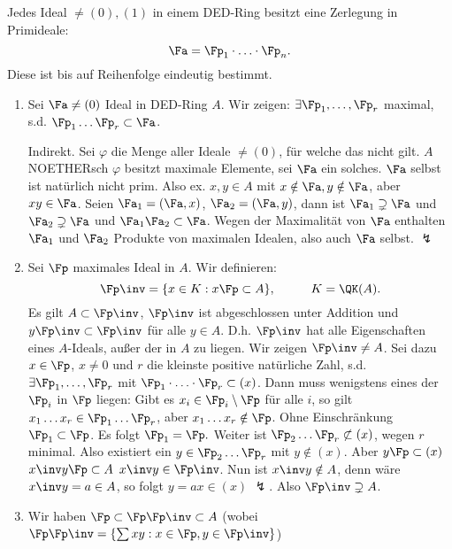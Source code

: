 \begin{Satz}
 Jedes Ideal $\neq (0),(1)$ in einem DED-Ring
 besitzt eine Zerlegung in Primideale: \[\Fa=\Fp_1\cdot\ldots\cdot \Fp_n. \]
 Diese ist bis auf Reihenfolge eindeutig bestimmt.
\end{Satz}

\begin{Beweis}
 \begin{enumerate}
  \item Sei $\Fa\neq (0)$ Ideal in DED-Ring $A$. Wir zeigen: $\exists \Fp_1,\ldots,\Fp_r$ maximal, s.d. $\Fp_1\ldots\Fp_r\subset\Fa$.
  
  Indirekt. Sei $\varphi$ die Menge aller Ideale $\neq (0)$, für welche das nicht gilt. $A$ NOETHERsch \folge $\varphi$ besitzt maximale Elemente, sei $\Fa$ ein solches. $\Fa$ selbst ist natürlich nicht prim. Also ex. $x,y\in A$ mit $x\notin \Fa, y\notin\Fa$, aber $xy\in\Fa$. Seien $\Fa_1=(\Fa,x)$, $\Fa_2=(\Fa,y)$, dann ist $\Fa_1\supsetneq \Fa$ und $\Fa_2\supsetneq \Fa$ und $\Fa_1\Fa_2\subset\Fa$. Wegen der Maximalität von $\Fa$ enthalten $\Fa_1$ und $\Fa_2$ Produkte von maximalen Idealen, also auch $\Fa$ selbst. $\lightning$
  \item Sei $\Fp$ maximales Ideal in $A$. Wir definieren:
  \[ \Fp\inv = \{ x\in K : x\Fp\subset A\},\hspace{1cm} K=\QK(A).\]
  Es gilt $A\subset \Fp\inv$, $\Fp\inv$ ist abgeschlossen unter Addition und $y\Fp\inv\subset\Fp\inv$ für alle $y\in A$. D.h. $\Fp\inv$ hat alle Eigenschaften eines $A$-Ideals, außer der in $A$ zu liegen. Wir zeigen $\Fp\inv\neq A$.
  Sei dazu $x\in\Fp$, $x\neq 0$ und $r$ die kleinste positive natürliche Zahl, s.d. $\exists \Fp_1,\ldots,\Fp_r$ mit $\Fp_1\cdot\ldots\cdot \Fp_r\subset (x)$.
  Dann muss wenigstens eines der $\Fp_i$ in $\Fp$ liegen: Gibt es $x_i\in\Fp_i\setminus\Fp$ für alle $i$, so gilt $x_1\ldots x_r\in\Fp_1\ldots\Fp_r$, aber $x_1\ldots x_r\notin \Fp$. Ohne Einschränkung $\Fp_1\subset \Fp$. Es folgt $\Fp_1=\Fp.$ Weiter ist $\Fp_2\ldots\Fp_r\not\subset (x)$, wegen $r$ minimal. Also existiert ein $y\in\Fp_2\ldots\Fp_r$ mit $y\notin (x)$. Aber $y\Fp\subset (x)$ \folge $x\inv y \Fp\subset A$ \folge $x\inv y\in \Fp\inv$. Nun ist $x\inv y\notin A$, denn wäre $x\inv y=a\in A$, so folgt $y=ax\in (x)$ $\lightning$. Also $\Fp\inv\supsetneq A$.
  \item Wir haben $\Fp\subset \Fp\Fp\inv \subset A$ (wobei $\Fp\Fp\inv=\{\sum x y : x\in \Fp, y\in\Fp\inv\}$)
  

\end{enumerate}
\end{Beweis}
